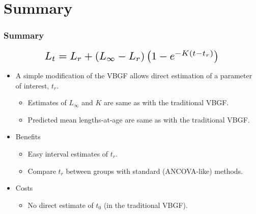 \documentclass[xcolor=dvipsnames]{beamer}\usepackage[]{graphicx}\usepackage[]{color}
\newcommand*{\Scale}[2][4]{\scalebox{#1}{\ensuremath{#2}}}%
\begin{document}
\section{Summary}

\begin{frame}[fragile, t]
\frametitle{Summary}
\vspace{-14pt}
\[\Scale[1.5]{ L_{t} = L_{r} + \left(L_{\infty}-L_{r}\right)\left(1-e^{-K(t-t_{r})}\right) }\]
\bigskip
\begin{itemize}
  \item A simple modification of the VBGF allows direct estimation of a parameter of interest, $t_{r}$.
  \begin{itemize}
    \item Estimates of $L_{\infty}$ and $K$ are same as with the traditional VBGF.
    \item Predicted mean lengths-at-age are same as with the traditional VBGF.
  \end{itemize}
  \pause
  \bigskip
  \item Benefits
  \begin{itemize}
    \item Easy interval estimates of $t_{r}$.
    \item Compare $t_{r}$ between groups with standard (ANCOVA-like) methods.
  \end{itemize}
  \pause
  \smallskip
  \item Costs
  \begin{itemize}
    \item No direct estimate of $t_{0}$ (in the traditional VBGF).
  \end{itemize}
\end{itemize}
\end{frame}


\end{document}
